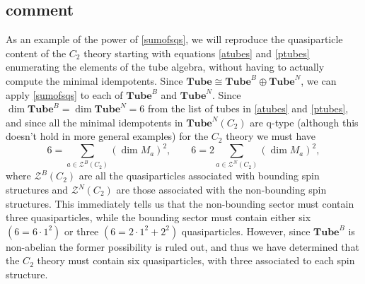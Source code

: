 \documentclass[12pt,a4paper]{article}
\newcommand{\mcz}{\mathcal{Z}}
\newcommand\be            {\begin{equation}}
\newcommand\ee            {\end{equation}}
\newcommand{\tube}{\textbf{Tube}}
\begin{document}
 
\subsection{comment}
As an example of the power of \eqref{sumofsqs}, we will reproduce the quasiparticle content of the $C_2$ theory starting with equations \eqref{atubes} and \eqref{ptubes} enumerating the elements of the tube algebra, without having to actually compute the minimal idempotents. 
Since $\tube \cong \tube^B \oplus \tube^N$, we can apply \eqref{sumofsqs} to each of $\tube^B$ and $\tube^N$. 
Since $\dim \tube^B = \dim \tube^N = 6$ from the list of tubes in \eqref{atubes} and \eqref{ptubes}, and since all the minimal idempotents in $\tube^N(C_2)$ are q-type (although this doesn't hold in more general examples)
for the $C_2$ theory we must have 
\be 6 = \sum_{a \in \mcz^B(C_2)} (\dim M_a)^2,\qquad 6 = 2 \sum_{a\in \mcz^N(C_2)} (\dim M_a)^2,\ee
where $\mcz^B(C_2)$ are all the quasiparticles associated with bounding spin structures and $\mcz^N(C_2)$ are those associated with the non-bounding spin structures. 
This immediately tells us that the non-bounding sector must contain three quasiparticles, while the bounding sector must contain either six $(6 = 6\cdot 1^2)$ or three $(6=2\cdot 1^2 + 2^2)$ quasiparticles. 
However, since $\tube^B$ is non-abelian the former possibility is ruled out, and thus we have determined that the $C_2$ theory must contain six quasiparticles, with three associated to each spin structure. 
 
 
\end{document}
